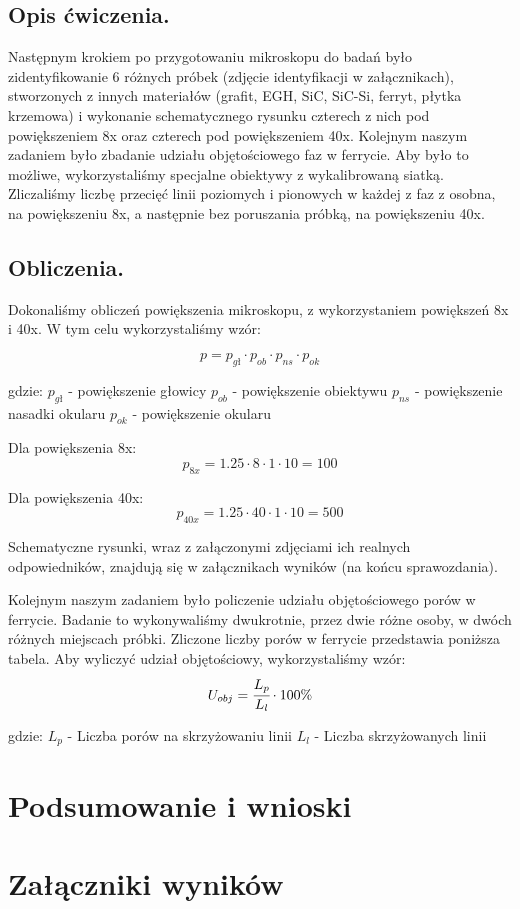 \subsection{Opis ćwiczenia.}

Następnym krokiem po przygotowaniu mikroskopu do badań było zidentyfikowanie 6 różnych próbek (zdjęcie identyfikacji w załącznikach), stworzonych z innych materiałów (grafit, EGH, SiC, SiC-Si, ferryt, płytka krzemowa) i wykonanie schematycznego rysunku czterech z nich pod powiększeniem 8x oraz czterech pod powiększeniem 40x. Kolejnym naszym zadaniem było zbadanie udziału objętościowego faz w ferrycie. Aby było to możliwe, wykorzystaliśmy specjalne obiektywy z wykalibrowaną siatką. 
Zliczaliśmy liczbę przecięć linii poziomych i pionowych w każdej z faz z osobna, na powiększeniu 8x, a następnie bez poruszania próbką, na powiększeniu 40x.

\subsection{Obliczenia.}

Dokonaliśmy obliczeń powiększenia mikroskopu, z wykorzystaniem powiększeń 8x i 40x. W tym celu wykorzystaliśmy wzór:

$$p=p_{gł}\cdot p_{ob}\cdot p_{ns}\cdot p_{ok}$$

gdzie:
\newline
$p_{gł}$ - powiększenie głowicy
\newline
$p_{ob}$ - powiększenie obiektywu
\newline
$p_{ns}$ - powiększenie nasadki okularu
\newline
$p_{ok}$ - powiększenie okularu
\newline

Dla powiększenia 8x: 
$$p_{8x}=1.25\cdot 8\cdot 1\cdot 10=100$$

Dla powiększenia 40x:
$$p_{40x}=1.25\cdot 40\cdot 1\cdot 10=500$$

Schematyczne rysunki, wraz z załączonymi zdjęciami ich realnych odpowiedników, znajdują się w załącznikach wyników (na końcu sprawozdania).
\newline

Kolejnym naszym zadaniem było policzenie udziału objętościowego porów w ferrycie. Badanie to wykonywaliśmy dwukrotnie, przez dwie różne osoby, w dwóch różnych miejscach próbki. Zliczone liczby porów w ferrycie przedstawia poniższa tabela. Aby wyliczyć udział objętościowy, wykorzystaliśmy wzór:
$$U_{obj}=\cfrac{L_p}{L_l} \cdot 100\%$$
\newline

gdzie:
\newline
$L_p$ - Liczba porów na skrzyżowaniu linii
\newline
$L_l$ - Liczba skrzyżowanych linii




\section{Podsumowanie i wnioski}

\section{Załączniki wyników}


